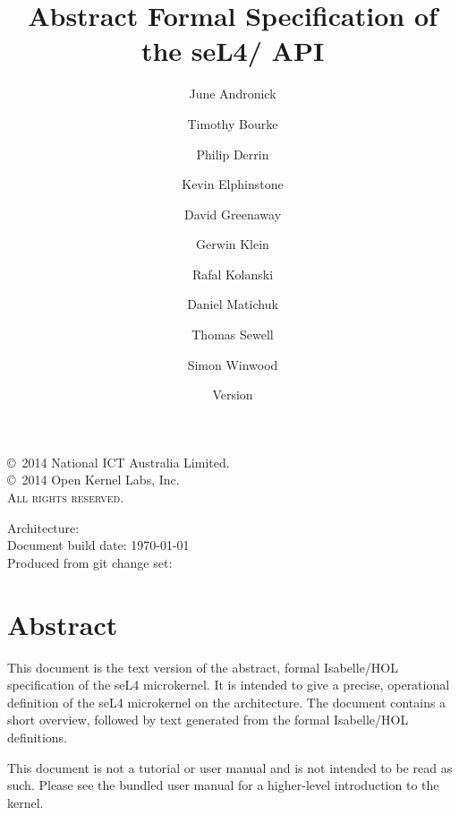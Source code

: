 \documentclass[10pt,a4paper]{scrbook}
\newcommand{\version}{\xspace}
\newcommand{\arch}{\xspace}
\newcommand{\gitid}{\xspace}
\begin{document}
\title{Abstract Formal Specification of the seL4/\arch API}

\date{Version \version}

\author{%
June Andronick \and
Timothy Bourke \and
Philip Derrin \and
Kevin Elphinstone \and
David Greenaway \and
Gerwin Klein \and
Rafal Kolanski \and
Daniel Matichuk \and
Thomas Sewell \and
Simon Winwood
}


\maketitle

\thispagestyle{empty}

\vfill

\copyright~2014 National ICT Australia Limited.\\
\copyright~2014 Open Kernel Labs, Inc.\\

\textsc{All rights reserved}.

\bigskip

Architecture: \arch\\
Document build date: \today\\
Produced from git change set: \gitid

\clearpage

\chapter*{Abstract}
This document is the text version of the abstract, formal
Isabelle/HOL specification of the seL4 microkernel. It is
intended to give a precise, operational definition of the
seL4 microkernel on the \arch architecture.
The document contains a short overview, followed by
text generated from the formal Isabelle/HOL definitions.

This document is not a tutorial or user manual and is not intended to be read
as such. Please see the bundled user manual for a higher-level introduction to
the kernel.


\cleardoublepage

\tableofcontents





\end{document}
